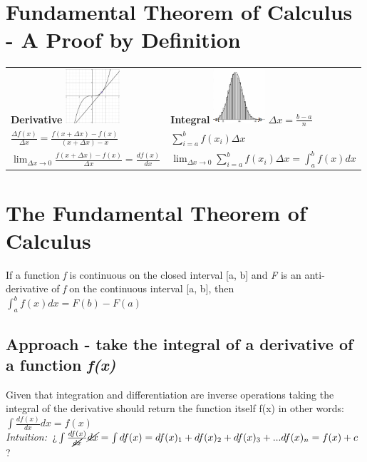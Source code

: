 \documentclass{article}
\author{Uzair Akram}
\begin{document}
\section*{Fundamental Theorem of Calculus - A Proof by Definition}

\begin{tabular}{l l}
\textbf{Derivative}  \hspace{2cm} \includegraphics[height=2cm]{assets/derivative.png} \hspace{2cm}  &  \textbf{Integral}   \hspace{2cm}  \includegraphics[height=2cm]{assets/integral.png}  $\Delta x = \frac{b - a}{n}$ \\
$\frac{\Delta f(x)}{\Delta x} = \frac{f(x + \Delta x) - f(x)}{(x + \Delta x) - x}$  &  $\sum\limits_{i=a}^b f(x_i)\Delta x$ \\
$\lim_{\Delta x\to 0} \frac{f(x + \Delta x) - f(x)}{\Delta x} = \frac{df(x)}{dx}$  &  $\lim_{\Delta x\to 0}\sum\limits_{i=a}^b f(x_i)\Delta x = \int_{a}^b f(x)dx$ \\
\end{tabular}

\section*{The Fundamental Theorem of Calculus}
If a function \emph{f} is continuous on the closed interval [a, b] and \emph{F} is an anti-derivative of \emph{f} on the continuous interval [a, b], then $\int_{a}^b f(x)dx = F(b) - F(a)$

\subsection*{Approach - take the integral of a derivative of a function \emph{f(x)}}
Given that integration and differentiation are inverse operations taking the integral of the derivative should return the function itself f(x) in other words:  $\int \frac{df(x)}{dx}dx = f(x)$ \\
\emph{Intuition: } %
$\text{?`}\int \frac{df(x)}{\cancel{dx}}\cancel{dx} = \int df(x) = df(x)_1 + df(x)_2 + df(x)_3 + ... df(x)_n = f(x) + c$ ? \\
\end{document}
